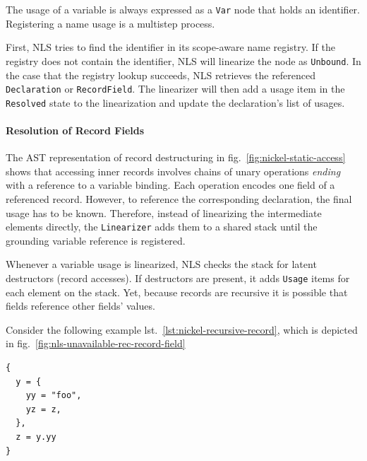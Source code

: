\documentclass[
  a4paper,
  bibtex,
  english,
  nomenclature]{kthlatex/kththesis/kththesis}
\begin{document}
The usage of a variable is always expressed as a \texttt{Var} node that
holds an identifier. Registering a name usage is a multistep process.

First, NLS tries to find the identifier in its scope-aware name
registry. If the registry does not contain the identifier, NLS will
linearize the node as \texttt{Unbound}. In the case that the registry
lookup succeeds, NLS retrieves the referenced \texttt{Declaration} or
\texttt{RecordField}. The linearizer will then add a usage item in the
\texttt{Resolved} state to the linearization and update the
declaration's list of usages.

\hypertarget{sec:resolution-of-record-fields}{%
\paragraph{Resolution of Record
Fields}\label{sec:resolution-of-record-fields}}

The AST representation of record destructuring in
fig.~\ref{fig:nickel-static-access} shows that accessing inner records
involves chains of unary operations \emph{ending} with a reference to a
variable binding. Each operation encodes one field of a referenced
record. However, to reference the corresponding declaration, the final
usage has to be known. Therefore, instead of linearizing the
intermediate elements directly, the \texttt{Linearizer} adds them to a
shared stack until the grounding variable reference is registered.

Whenever a variable usage is linearized, NLS checks the stack for latent
destructors (record accesses). If destructors are present, it adds
\texttt{Usage} items for each element on the stack. Yet, because records
are recursive it is possible that fields reference other fields' values.

Consider the following example lst.~\ref{lst:nickel-recursive-record},
which is depicted in fig.~\ref{fig:nls-unavailable-rec-record-field}

\begin{codelisting}

\caption{Example of a recursive record}

\hypertarget{lst:nickel-recursive-record}{%
\label{lst:nickel-recursive-record}}%
\begin{verbatim}
{
  y = {
    yy = "foo",
    yz = z,
  },
  z = y.yy
}
\end{verbatim}

\end{codelisting}
\end{document}
